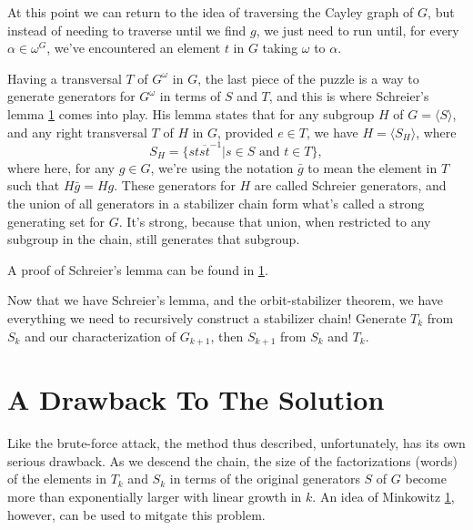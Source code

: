 \documentclass[12pt]{article}
\begin{document}
At this point we can return to the idea of traversing the Cayley graph of $G$,
but instead of needing to traverse until we find $g$, we just need to run until,
for every $\alpha\in\omega^G$,
we've encountered an element $t$ in $G$ taking $\omega$ to $\alpha$.

Having a transversal $T$ of $G^\omega$ in $G$, the last piece of the
puzzle is a way to generate generators for $G^\omega$ in terms
of $S$ and $T$, and this is where Schreier's lemma \ref{} comes into play.
His lemma states that for any subgroup $H$ of $G=\langle S\rangle$, and
any right transversal $T$ of $H$ in $G$, provided $e\in T$, we have $H=\langle S_H\rangle$, where
\begin{equation*}
S_H = \{st\overline{st}^{-1}|\mbox{$s\in S$ and $t\in T$}\},
\end{equation*}
where here, for any $g\in G$, we're using the notation $\bar{g}$ to
mean the element in $T$ such that $H\bar{g}=H g$.
These generators for $H$ are called Schreier generators, and the union of all generators in
a stabilizer chain form what's called a strong generating set for $G$.
It's strong, because that union, when restricted to any subgroup in
the chain, still generates that subgroup.

A proof of Schreier's lemma can be found in \ref{}.

Now that we have Schreier's lemma, and the orbit-stabilizer theorem, we have everything
we need to recursively construct a stabilizer chain!  Generate $T_k$ from
$S_k$ and our characterization of $G_{k+1}$, then $S_{k+1}$ from $S_k$ and $T_k$.

\section{A Drawback To The Solution}

Like the brute-force attack, the method thus described, unfortunately, has its
own serious drawback.  As we descend the chain, the size of the factorizations
(words) of the elements in $T_k$ and $S_k$ in terms of the original generators
$S$ of $G$ become more than exponentially larger with linear growth in $k$.
An idea of Minkowitz \ref{}, however, can be used to mitgate this problem.
\end{document}
